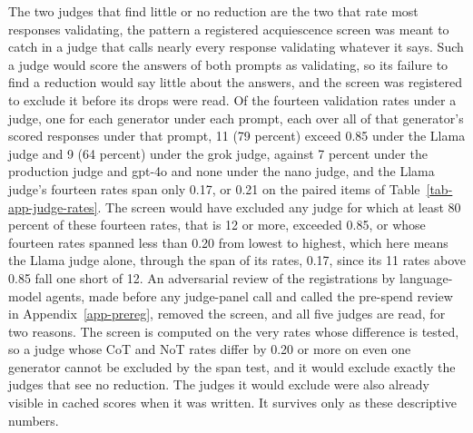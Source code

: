 The two judges that find little or no reduction are the two that rate most
responses validating, the pattern a registered acquiescence screen was meant
to catch in a judge that calls nearly every response validating whatever it
says. Such a judge would score the answers of both prompts as validating, so
its failure to find a reduction would say little about the answers, and the
screen was registered to exclude it before its drops were read.
Of the fourteen validation rates under a judge, one for
each generator under each prompt, each over all of that generator's scored
responses under that prompt, 11 (79 percent) exceed 0.85
under the Llama judge and 9 (64 percent) under the grok judge, against 7
percent under the production judge and gpt-4o and none under the nano judge, and the Llama
judge's fourteen rates span only 0.17, or 0.21 on the paired items of
Table~\ref{tab-app-judge-rates}.
The screen would have excluded any judge for which at least 80 percent of
these fourteen rates, that is 12 or more, exceeded 0.85, or whose fourteen
rates spanned less than 0.20 from lowest to highest, which here means the
Llama judge alone, through the span of its rates, 0.17, since its 11 rates
above 0.85 fall one short of 12. An adversarial review of the registrations
by language-model agents, made before any judge-panel call and called the
pre-spend review in Appendix~\ref{app-prereg}, removed the screen, and all
five judges are read, for two reasons. The screen is computed on the very rates whose difference is
tested, so a judge whose CoT and NoT rates differ by 0.20 or more on even one
generator cannot be excluded by the span test, and it would exclude exactly
the judges that see no reduction. The judges it would exclude were also
already visible in cached scores when it was written. It survives only as
these descriptive numbers.
